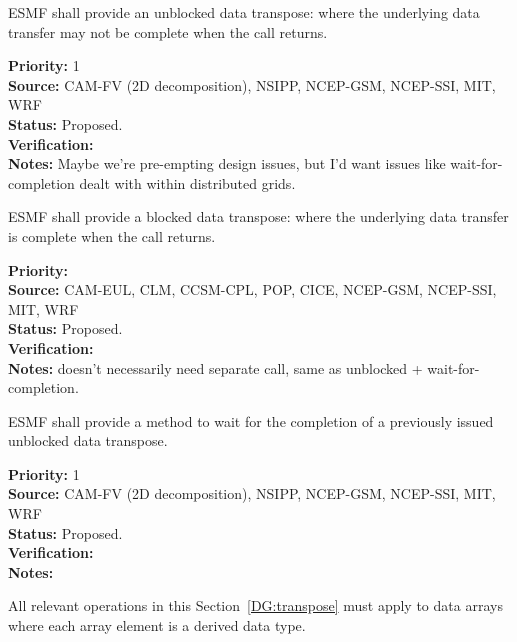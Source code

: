  \label{DG:transpose}


ESMF shall provide an unblocked data transpose: where the underlying
data transfer may not be complete when the call returns.

\begin{reqlist}
{\bf Priority:} 1 \\ 
{\bf Source:} CAM-FV (2D decomposition), NSIPP, NCEP-GSM, NCEP-SSI, MIT, WRF \\
{\bf Status:} Proposed. \\
{\bf Verification:} \\
{\bf Notes:} Maybe we're pre-empting design issues, but I'd want
  issues like wait-for-completion dealt with within distributed grids.
\end{reqlist}


ESMF shall provide a blocked data transpose: where the underlying
data transfer is complete when the call returns.

\begin{reqlist}
{\bf Priority:} \\
{\bf Source:} CAM-EUL, CLM, CCSM-CPL, POP, CICE, NCEP-GSM, NCEP-SSI, MIT, WRF \\
{\bf Status:} Proposed. \\
{\bf Verification:} \\
{\bf Notes:} doesn't necessarily need separate call, same as unblocked
  + wait-for-completion.
\end{reqlist}


ESMF shall provide a method to wait for the completion of a previously
issued unblocked data transpose.

\begin{reqlist}
{\bf Priority:} 1 \\ 
{\bf Source:} CAM-FV (2D decomposition), NSIPP, NCEP-GSM, NCEP-SSI, MIT, WRF \\
{\bf Status:} Proposed. \\
{\bf Verification:} \\
{\bf Notes:}
\end{reqlist}


All relevant operations in this Section~\ref{DG:transpose} must apply to
data arrays where each array element is a derived data type.

